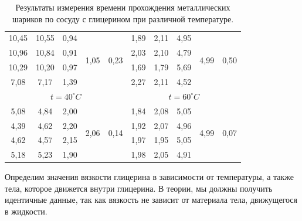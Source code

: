 \documentclass[12pt,a4paper]{article}
\begin{document}
\begin{table}[h!]
\begin{tabular}{|c|c|c|c|c||c|c|c|c|c|}
10,45 & 10,55 & 0,94 & \multirow{4}{*}{1,05} & \multirow{4}{*}{0,23} & 1,89 & 2,11 & 4,95 & \multirow{4}{*}{4,99} & \multirow{4}{*}{0,50} \\ \cline{1-3} \cline{6-8}
10,96 & 10,84 & 0,91 &                       &                       & 2,03 & 2,10 & 4,79 &                       &                       \\ \cline{1-3} \cline{6-8}
10,29 & 10,20 & 0,97 &                       &                       & 1,69 & 1,79 & 5,69 &                       &                       \\ \cline{1-3} \cline{6-8}
7,08  & 7,17  & 1,39 &                       &                       & 2,27 & 2,11 & 4,52 &                       &                       \\ \hline
\multicolumn{5}{|c|}{$t = 40^\circ  C$}                                              & \multicolumn{5}{c|}{$t = 60^\circ C $}  \\ \hline
5,08  & 4,84  & 2,00 & \multirow{4}{*}{2,06} & \multirow{4}{*}{0,14} & 1,84 & 2,08 & 5,05 & \multirow{4}{*}{4,99} & \multirow{4}{*}{0,07} \\ \cline{1-3} \cline{6-8}
4,39  & 4,62  & 2,20 &                       &                       & 1,92 & 2,07 & 4,96 &                       &                       \\ \cline{1-3} \cline{6-8}
4,62  & 4,57  & 2,15 &                       &                       & 1,97 & 1,95 & 5,05 &                       &                       \\ \cline{1-3} \cline{6-8}
5,18  & 5,23  & 1,90 &                       &                       & 1,98 & 2,05 & 4,91 &                       &                       \\ \hline
\end{tabular}
\caption{Результаты измерения времени прохождения металлических шариков по сосуду с глицерином при различной температуре.}
\label{tab:metal_balls_measuring}
\end{table}

\newpage

Определим значения вязкости глицерина в зависимости от температуры, а также тела, которое движется внутри глицерина. В теории, мы должны получить идентичные данные, так как вязкость не зависит от материала тела, движущегося в жидкости.
\end{document}
